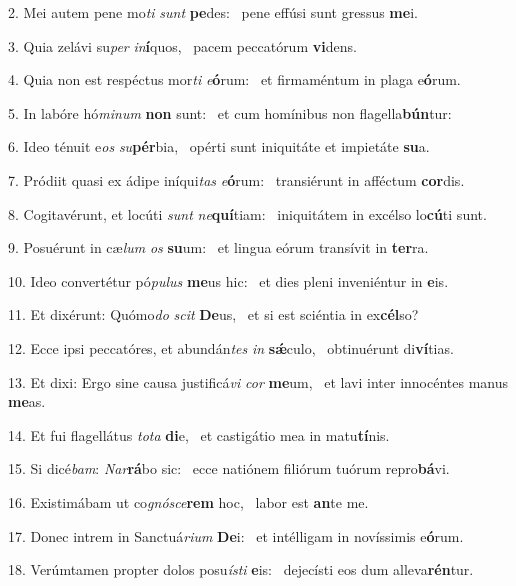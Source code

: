 2. Mei autem pene mo\textit{ti} \textit{sunt} \textbf{pe}des: \ast\  pene effúsi sunt gressus \textbf{me}i.\

3. Quia zelávi su\textit{per} \textit{in}\textbf{í}quos, \ast\  pacem peccatórum \textbf{vi}dens.\

4. Quia non est respéctus mor\textit{ti} \textit{e}\textbf{ó}rum: \ast\  et firmaméntum in plaga e\textbf{ó}rum.\

5. In labóre hó\textit{mi}\textit{num} \textbf{non} sunt: \ast\  et cum homínibus non flagella\textbf{bún}tur:\

6. Ideo ténuit e\textit{os} \textit{su}\textbf{pér}bia, \ast\  opérti sunt iniquitáte et impietáte \textbf{su}a.\

7. Pródiit quasi ex ádipe iníqui\textit{tas} \textit{e}\textbf{ó}rum: \ast\  transiérunt in afféctum \textbf{cor}dis.\

8. Cogitavérunt, et locúti \textit{sunt} \textit{ne}\textbf{quí}tiam: \ast\  iniquitátem in excélso lo\textbf{cú}ti sunt.\

9. Posuérunt in cæ\textit{lum} \textit{os} \textbf{su}um: \ast\  et lingua eórum transívit in \textbf{ter}ra.\

10. Ideo convertétur pó\textit{pu}\textit{lus} \textbf{me}us hic: \ast\  et dies pleni inveniéntur in \textbf{e}is.\

11. Et dixérunt: Quómo\textit{do} \textit{scit} \textbf{De}us, \ast\  et si est sciéntia in ex\textbf{cél}so?\

12. Ecce ipsi peccatóres, et abundán\textit{tes} \textit{in} \textbf{sǽ}culo, \ast\  obtinuérunt di\textbf{ví}tias.\

13. Et dixi: Ergo sine causa justificá\textit{vi} \textit{cor} \textbf{me}um, \ast\  et lavi inter innocéntes manus \textbf{me}as.\

14. Et fui flagellátus \textit{to}\textit{ta} \textbf{di}e, \ast\  et castigátio mea in matu\textbf{tí}nis.\

15. Si dicé\textit{bam}: \textit{Nar}\textbf{rá}bo sic: \ast\  ecce natiónem filiórum tuórum repro\textbf{bá}vi.\

16. Existimábam ut co\textit{gnó}\textit{sce}\textbf{rem} hoc, \ast\  labor est \textbf{an}te me.\

17. Donec intrem in Sanctuá\textit{ri}\textit{um} \textbf{De}i: \ast\  et intélligam in novíssimis e\textbf{ó}rum.\

18. Verúmtamen propter dolos posu\textit{ís}\textit{ti} \textbf{e}is: \ast\  dejecísti eos dum alleva\textbf{rén}tur.\

